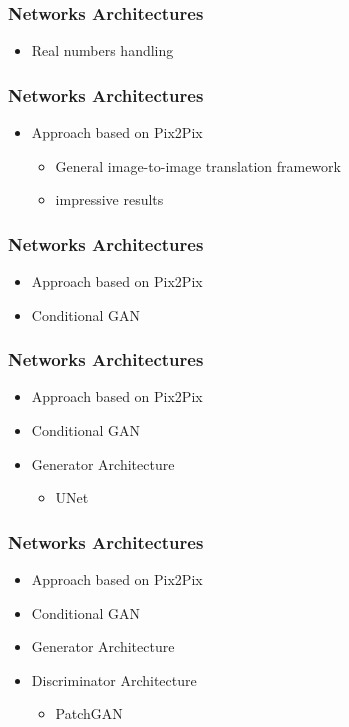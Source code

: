 \documentclass[18pt]{beamer}
\begin{document}
\begin{frame}
  \frametitle{Networks Architectures}
  \begin{itemize}
  \item Real numbers handling
  \end{itemize}
\end{frame}

\begin{frame}
  \frametitle{Networks Architectures}
  \begin{itemize}
  \item Approach based on Pix2Pix
    \begin{itemize}
    \item General image-to-image translation framework
    \item impressive results
    \end{itemize}
  \end{itemize}
\end{frame}

\begin{frame}
  \frametitle{Networks Architectures}
  \begin{itemize}
  \item Approach based on Pix2Pix
  \item Conditional GAN
  \end{itemize}
\end{frame}


\begin{frame}
  \frametitle{Networks Architectures}
  \begin{itemize}
  \item Approach based on Pix2Pix
  \item Conditional GAN
  \item Generator Architecture
    \begin{itemize}
    \item UNet
    \end{itemize}
  \end{itemize}
\end{frame}


\begin{frame}
  \frametitle{Networks Architectures}
  \begin{itemize}
  \item Approach based on Pix2Pix
  \item Conditional GAN
  \item Generator Architecture
  \item Discriminator Architecture
    \begin{itemize}
    \item PatchGAN
    \end{itemize}
  \end{itemize}
\end{frame}
\end{document}
